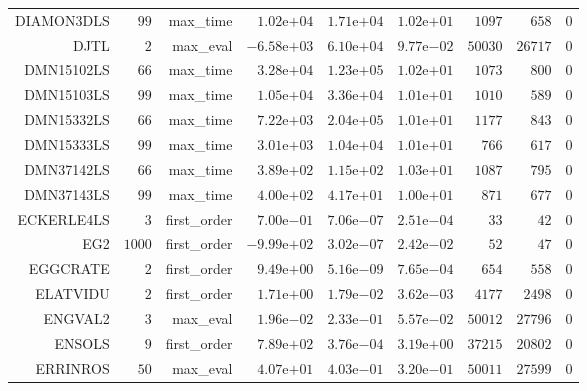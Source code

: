 \begin{longtable}{rrrrrrrrr}
DIAMON3DLS & \(    99\) & max\_time & \( 1.02\)e\(+04\) & \( 1.71\)e\(+04\) & \( 1.02\)e\(+01\) & \(  1097\) & \(   658\) & \(     0\) \\
DJTL & \(     2\) & max\_eval & \(-6.58\)e\(+03\) & \( 6.10\)e\(+04\) & \( 9.77\)e\(-02\) & \( 50030\) & \( 26717\) & \(     0\) \\
DMN15102LS & \(    66\) & max\_time & \( 3.28\)e\(+04\) & \( 1.23\)e\(+05\) & \( 1.02\)e\(+01\) & \(  1073\) & \(   800\) & \(     0\) \\
DMN15103LS & \(    99\) & max\_time & \( 1.05\)e\(+04\) & \( 3.36\)e\(+04\) & \( 1.01\)e\(+01\) & \(  1010\) & \(   589\) & \(     0\) \\
DMN15332LS & \(    66\) & max\_time & \( 7.22\)e\(+03\) & \( 2.04\)e\(+05\) & \( 1.01\)e\(+01\) & \(  1177\) & \(   843\) & \(     0\) \\
DMN15333LS & \(    99\) & max\_time & \( 3.01\)e\(+03\) & \( 1.04\)e\(+04\) & \( 1.01\)e\(+01\) & \(   766\) & \(   617\) & \(     0\) \\
DMN37142LS & \(    66\) & max\_time & \( 3.89\)e\(+02\) & \( 1.15\)e\(+02\) & \( 1.03\)e\(+01\) & \(  1087\) & \(   795\) & \(     0\) \\
DMN37143LS & \(    99\) & max\_time & \( 4.00\)e\(+02\) & \( 4.17\)e\(+01\) & \( 1.00\)e\(+01\) & \(   871\) & \(   677\) & \(     0\) \\
ECKERLE4LS & \(     3\) & first\_order & \( 7.00\)e\(-01\) & \( 7.06\)e\(-07\) & \( 2.51\)e\(-04\) & \(    33\) & \(    42\) & \(     0\) \\
EG2 & \(  1000\) & first\_order & \(-9.99\)e\(+02\) & \( 3.02\)e\(-07\) & \( 2.42\)e\(-02\) & \(    52\) & \(    47\) & \(     0\) \\
EGGCRATE & \(     2\) & first\_order & \( 9.49\)e\(+00\) & \( 5.16\)e\(-09\) & \( 7.65\)e\(-04\) & \(   654\) & \(   558\) & \(     0\) \\
ELATVIDU & \(     2\) & first\_order & \( 1.71\)e\(+00\) & \( 1.79\)e\(-02\) & \( 3.62\)e\(-03\) & \(  4177\) & \(  2498\) & \(     0\) \\
ENGVAL2 & \(     3\) & max\_eval & \( 1.96\)e\(-02\) & \( 2.33\)e\(-01\) & \( 5.57\)e\(-02\) & \( 50012\) & \( 27796\) & \(     0\) \\
ENSOLS & \(     9\) & first\_order & \( 7.89\)e\(+02\) & \( 3.76\)e\(-04\) & \( 3.19\)e\(+00\) & \( 37215\) & \( 20802\) & \(     0\) \\
ERRINROS & \(    50\) & max\_eval & \( 4.07\)e\(+01\) & \( 4.03\)e\(-01\) & \( 3.20\)e\(-01\) & \( 50011\) & \( 27599\) & \(     0\) \\

\end{longtable}
